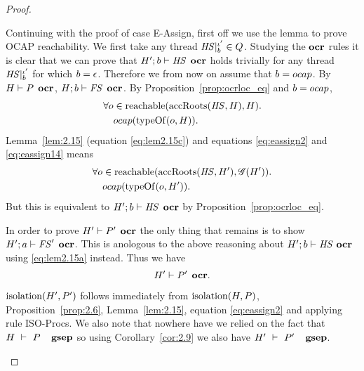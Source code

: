 \begin{proof}
\begin{description}
\begin{description}
\begin{description}
              Continuing with the proof of case {\sc E-Assign}, first off we use
              the lemma to prove OCAP reachability.  We first take any thread
              $\mathit{HS}|_b^{\iota'} \in Q$. Studying the $\mbox{\bf ocr}$ rules it is clear that we can
              prove that $H'; b \vdash \mathit{HS} \:\: \mbox{\bf ocr}$ holds trivially for any
              thread $\mathit{HS}|_b^{\iota'}$ for which $b = \mbox{$\epsilon$}$. Therefore we from now on
              assume that $b = \mbox{$ocap$}$.  By $H \vdash P \:\: \mbox{\bf ocr}$, $H; b \vdash
              \mathit{FS} \:\: \mbox{\bf ocr}$. By Proposition~\ref{prop:ocrloc_eq} and $b =
              \mbox{$ocap$}$,
              \begin{equation}\label{eq:eassign14}
                \begin{aligned}
                  \forall o &\in \mbox{$\mathrm{reachable}$}(\mbox{$\mathrm{accRoots}$}(\mathit{HS}, H), H). \\
                            &\mbox{$ocap$}(\mbox{$\mathrm{typeOf}$}(o, H)).
                \end{aligned}
              \end{equation}
              Lemma~\ref{lem:2.15} (equation \eqref{eq:lem2.15c}) and equations
              \eqref{eq:eassign2} and \eqref{eq:eassign14} means 
              \begin{equation}
                \begin{aligned}
                  \forall o &\in \mbox{$\mathrm{reachable}$}(\mbox{$\mathrm{accRoots}$}(\mathit{HS}, H'), \mathscr{G}(H')). \\
                            &\mbox{$ocap$}(\mbox{$\mathrm{typeOf}$}(o, H')).
                \end{aligned}
              \end{equation}
              But this is equivalent to $H';b \vdash \mathit{HS} \:\: \mbox{\bf ocr}$ by
              Proposition~\ref{prop:ocrloc_eq}. 

              In order to prove $H' \vdash P' \:\: \mbox{\bf ocr}$ the only thing that
              remains is to show $H';a \vdash \mathit{FS}' \:\: \mbox{\bf ocr}$. This is anologous
              to the above reasoning about $H';b \vdash \mathit{HS}~\mbox{\bf ocr}$ using
              \eqref{eq:lem2.15a} instead. Thus we have
              \begin{equation*}
                H' \vdash P' \:\: \mbox{\bf ocr}.
              \end{equation*}

              $\mbox{$\mathrm{isolation}$}(H', P')$ follows immediately from $\mbox{$\mathrm{isolation}$}(H, P)$,
              Proposition~\ref{prop:2.6}, Lemma~\ref{lem:2.15}, equation
              \eqref{eq:eassign2} and applying rule {\sc ISO-Procs}. We also
              note that nowhere have we relied on the fact that
              $H~\vdash~P~\:\:~\mbox{\bf gsep}$ so using Corollary~\ref{cor:2.9} we also
              have $H'~\vdash~P'~\:\:~\mbox{\bf gsep}$.


\end{description}
\end{description}
\end{description}
\end{proof}
